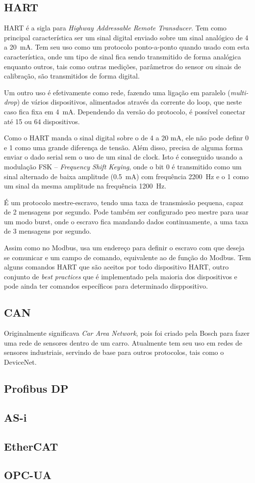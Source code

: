 \subsection{HART}
HART é a sigla para \emph{Highway Addressable Remote Transducer}. Tem como principal característica ser um sinal digital enviado sobre um sinal analógico de 4 a \SI{20}{mA}. Tem seu uso como um protocolo ponto-a-ponto quando usado com esta característica, onde um tipo de sinal fica sendo transmitido de forma analógica enquanto outros, tais como outras medições, parâmetros do sensor ou sinais de calibração, são transmitidos de forma digital.

Um outro uso é efetivamente como rede, fazendo uma ligação em paralelo (\emph{multi-drop}) de vários dispositivos, alimentados através da corrente do loop, que neste caso fica fixa em \SI{4}{mA}. Dependendo da versão do protocolo, é possível conectar até 15 ou 64 dispositivos.

Como o HART manda o sinal digital sobre o de 4 a 20 mA, ele não pode definr 0 e 1 como uma grande diferença de tensão. Além disso, precisa de alguma forma enviar o dado serial sem o uso de um sinal de clock. Isto é conseguido usando a modulação FSK -- \emph{Frequency Shift Keying}, onde o bit 0 é transmitido como um sinal alternado de baixa amplitude (\SI{0,5}{mA}) com frequência \SI{2200}{Hz} e o 1 como um sinal da mesma amplitude na frequência \SI{1200}{Hz}.

É um protocolo mestre-escravo, tendo uma taxa de transmissão pequena, capaz de 2 mensagens por segundo. Pode também ser configurado peo mestre para usar um modo burst, onde o escravo fica mandando dados continuamente, a uma taxa de 3 mensagens por segundo.

Assim como no Modbus, usa um endereço para definir o escravo com que deseja se comunicar e um campo de comando, equivalente ao de função do Modbus. Tem alguns comandos HART que são aceitos por todo dispositivo HART, outro conjunto de \emph{best practices} que é implementado pela maioria dos dispositivos e pode ainda ter comandos específicos para determinado disppositivo.

\subsection{CAN}
Originalmente significava \emph{Car Area Network}, pois foi criado pela Bosch para fazer uma rede de sensores dentro de um carro. Atualmente tem seu uso em redes de sensores industriais, servindo de base para outros protocolos, tais como o DeviceNet.


\subsection{Profibus DP}



\subsection{AS-i}



\subsection{EtherCAT}



\subsection{OPC-UA}


